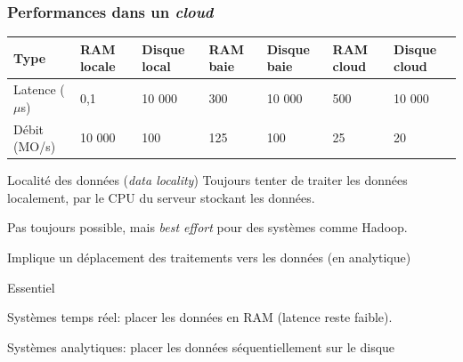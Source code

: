 \begin{frame}
\frametitle{Performances dans un \textit{cloud}}

\begin{small}
\begin{tabular}{l|p{1cm}|p{1cm}|p{1cm}|p{1cm}|p{1cm}|p{1cm}}
{\bf Type} & \textbf{RAM locale} & \textbf{Disque local} & \textbf{RAM baie}  & \textbf{Disque baie} 
    & \textbf{RAM cloud}  & \textbf{Disque cloud}   \\
\hline
Latence ($\mu$s) & 0,1 & 10 000  & 300  & 10 000  & 500   &  10 000\\
Débit (MO/s) & 10 000 & 100  & 125  & 100  & 25   & 20\\
\hline
\end{tabular}

\end{small}


\begin{remblock}{Localité des données (\textit{data locality})}
Toujours tenter de traiter les données \alert{localement}, par le CPU 
du serveur stockant les données.
\begin{redbullet}
  \item Pas toujours possible, mais \emph{best effort} pour des systèmes comme Hadoop.
  \item \alert{Implique un déplacement des traitements vers les données} (en analytique)
 \end{redbullet}
\end{remblock}

\vfill

\begin{defblock}{Essentiel}
\begin{redbullet}
  \item Systèmes temps réel: \alert{placer les données en RAM} (latence reste faible).
  \item Systèmes analytiques: \alert{placer les données séquentiellement sur le disque} 
\end{redbullet}
\end{defblock}


\end{frame}




